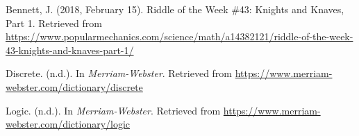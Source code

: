 \begin{thebibliography}{9}
	Bennett, J. (2018, February 15). Riddle of the Week \#43: Knights and Knaves, Part 1. Retrieved from \url{https://www.popularmechanics.com/science/math/a14382121/riddle-of-the-week-43-knights-and-knaves-part-1/}

	Discrete. (n.d.). In \textit{Merriam-Webster}. Retrieved from \url{https://www.merriam-webster.com/dictionary/discrete}
	
	Logic. (n.d.). In \textit{Merriam-Webster}. Retrieved from \url{https://www.merriam-webster.com/dictionary/logic}
\end{thebibliography}